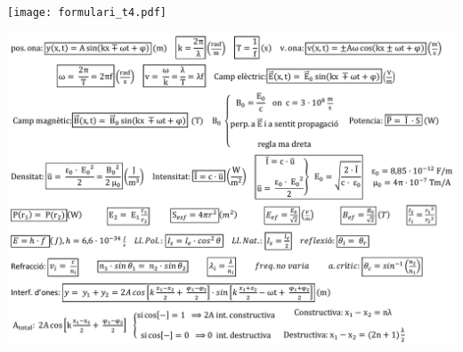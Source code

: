 \documentclass[12pt]{article}
\begin{document}
\texttt{[image: formulari\_t4.pdf]}

\includegraphics[width=\linewidth]{Auxiliar/aa.png}
\end{document}
